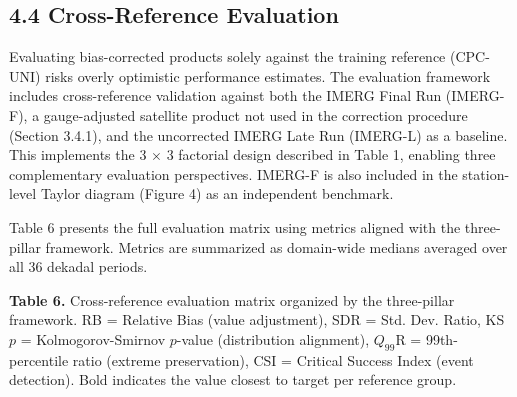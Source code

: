\documentclass[
]{article}
\begin{document}
\subsection{4.4 Cross-Reference
Evaluation}\label{cross-reference-evaluation}

Evaluating bias-corrected products solely against the training reference
(CPC-UNI) risks overly optimistic performance estimates. The evaluation
framework includes cross-reference validation against both the IMERG
Final Run (IMERG-F), a gauge-adjusted satellite product not used in the
correction procedure (Section 3.4.1), and the uncorrected IMERG Late Run
(IMERG-L) as a baseline. This implements the 3 \(\times\) 3 factorial
design described in Table 1, enabling three complementary evaluation
perspectives. IMERG-F is also included in the station-level Taylor
diagram (Figure 4) as an independent benchmark.

Table 6 presents the full evaluation matrix using metrics aligned with
the three-pillar framework. Metrics are summarized as domain-wide
medians averaged over all 36 dekadal periods.

\textbf{Table 6.} Cross-reference evaluation matrix organized by the
three-pillar framework. RB = Relative Bias (value adjustment), SDR =
Std. Dev. Ratio, KS \(p\) = Kolmogorov-Smirnov \(p\)-value (distribution
alignment), \(Q_{99}\)R = 99th-percentile ratio (extreme preservation),
CSI = Critical Success Index (event detection). Bold indicates the value
closest to target per reference group.
\end{document}
